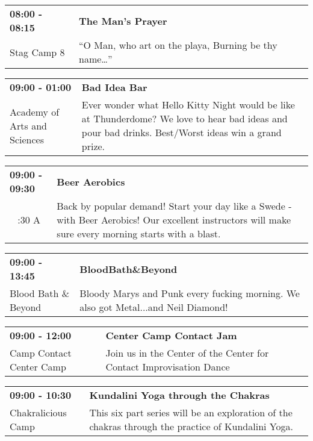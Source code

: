 \begin{tabular}{ p{1in} p{2.2in} }
    \textbf{08:00 - 08:15} & \textbf{The Man's Prayer} \\
    Stag Camp 8 \newline  & ``O Man, who art on the playa, Burning be thy name\ldots '' \\
    \hline 
\end{tabular}
    
\begin{tabular}{ p{1in} p{2.2in} }
    \textbf{09:00 - 01:00} & \textbf{Bad Idea Bar} \\
    Academy of Arts and Sciences \newline  & Ever wonder what Hello Kitty Night would be like at Thunderdome? We love to hear bad ideas and pour bad drinks. Best/Worst ideas win a grand prize. \\
    \hline 
\end{tabular}
    
\begin{tabular}{ p{1in} p{2.2in} }
    \textbf{09:00 - 09:30} & \textbf{Beer Aerobics} \\
    ~ \newline 4:30 A & Back by popular demand! Start your day like a Swede - with Beer Aerobics! Our excellent instructors will make sure every morning starts with a blast. \\
    \hline 
\end{tabular}
    
\begin{tabular}{ p{1in} p{2.2in} }
    \textbf{09:00 - 13:45} & \textbf{BloodBath\&Beyond} \\
    Blood Bath \& Beyond \newline  & Bloody Marys and Punk every fucking morning. We also got Metal...and Neil Diamond! \\
    \hline 
\end{tabular}
    
\begin{tabular}{ p{1in} p{2.2in} }
    \textbf{09:00 - 12:00} & \textbf{Center Camp Contact Jam} \\
    Camp Contact \newline Center Camp & Join us in the Center of the Center for Contact Improvisation Dance \\
    \hline 
\end{tabular}
    
\begin{tabular}{ p{1in} p{2.2in} }
    \textbf{09:00 - 10:30} & \textbf{Kundalini Yoga through the Chakras} \\
    Chakralicious Camp \newline  & This six part series will be an exploration of the chakras through the practice of Kundalini Yoga. \\
    \hline 
\end{tabular}
    
